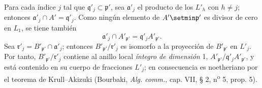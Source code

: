 Para cada índice $j$ tal que $\mathfrak q'_j\subset\mathfrak p'$,
sea $\mathfrak a'_j$ el producto de los $L'_h$ con $h\neq j$;
entonces $\mathfrak a'_j\cap A'=\mathfrak q'_j$. Como ningún elemento
de $A'\setmin\mathfrak p'$ es divisor de cero en $L_1$, se tiene también
\[
\mathfrak a'_j\cap A'_{\mathfrak p'}=
\mathfrak q'_jA'_{\mathfrak p'}.
\]
Sea $\mathfrak r'_j=B'_{\mathfrak p'}\cap\mathfrak a'_j$; entonces
$B'_{\mathfrak p'}/\mathfrak r'_j$ es isomorfo a la proyección de
$B'_{\mathfrak p'}$ en $L'_j$. Por tanto,
$B'_{\mathfrak p'}/\mathfrak r'_j$ contiene al anillo local \emph{íntegro de dimensión} 1,
$A'_{\mathfrak p'}/\mathfrak q'_jA'_{\mathfrak p'}$, y está contenido
en su cuerpo de fracciones $L'_j$; en consecuencia es noetheriano
por el teorema de Krull--Akizuki (Bourbaki, \emph{Alg. comm.}, cap. VII,
§ 2, n\textsuperscript{o} 5, prop. 5).

